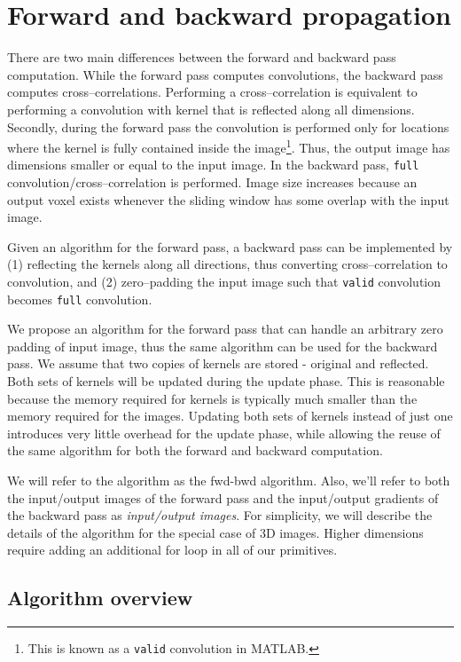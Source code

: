 \section{Forward and backward propagation}

  There are two main differences between the forward and backward pass
  computation.  While the forward pass computes convolutions, the
  backward pass computes cross--correlations.  Performing a
  cross--correlation is equivalent to performing a convolution with
  kernel that is reflected along all dimensions.  Secondly, during the
  forward pass the convolution is performed only for locations where
  the kernel is fully contained inside the image\footnote{This is
    known as a \texttt{valid} convolution in MATLAB.}.  Thus, the
  output image has dimensions smaller or equal to the input image.  In
  the backward pass, \texttt{full} convolution/cross--correlation is
  performed.  Image size increases because an output voxel exists
  whenever the sliding window has some overlap with the input image.

  Given an algorithm for the forward pass, a backward pass can be
  implemented by (1) reflecting the kernels along all directions, thus
  converting cross--correlation to convolution, and (2) zero--padding
  the input image such that \texttt{valid} convolution becomes
  \texttt{full} convolution.

  We propose an algorithm for the forward pass that can handle an
  arbitrary zero padding of input image, thus the same algorithm can
  be used for the backward pass.  We assume that two copies of kernels
  are stored - original and reflected.  Both sets of kernels will be
  updated during the update phase.  This is reasonable because the
  memory required for kernels is typically much smaller than the
  memory required for the images.  Updating both sets of kernels
  instead of just one introduces very little overhead for the update
  phase, while allowing the reuse of the same algorithm for both the
  forward and backward computation.

  We will refer to the algorithm as the fwd-bwd algorithm.  Also,
  we'll refer to both the input/output images of the forward pass and
  the input/output gradients of the backward pass as
  \emph{input/output images}.  For simplicity, we will describe the
  details of the algorithm for the special case of 3D images.  Higher
  dimensions require adding an additional for loop in all of our
  primitives.

  \subsection{Algorithm overview}


